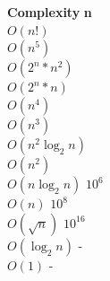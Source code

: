 \begin{tabbing}
\textbf{Complexity}\hspace{4cm} \=  \textbf{n}\hspace{3cm}   \\ 
$O(n!)$ \\ 
$O(n^{5})$ \\ 
$O(2^{n}*n^{2})$ \\ 
$O(2^{n}*n)$ \\ 
$O(n^{4})$ \\ 
$O(n^{3})$ \\ 
$O(n^{2}\log_{2}n)$ \\ 
$O(n^{2})$ \\ 
$O(n\log_{2}n)$ \> $10^{6}$\\ 
$O(n)$ \> $10^{8}$\\ 
$O(\sqrt{n})$ \> $10^{16}$\\ 
$O(\log_{2}n)$ \> -\\ 
$O(1)$ \> -\\ 
\end{tabbing}


